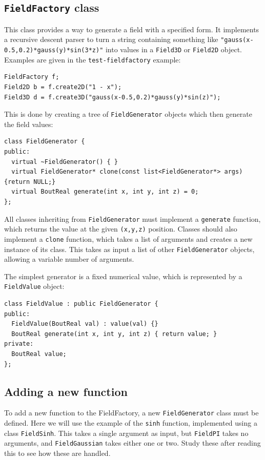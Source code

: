 \documentclass[12pt]{article}
\begin{document}
\subsection{\lstinline!FieldFactory! class}

This class provides a way to generate a field with a specified form. It implements
a recursive descent parser to turn a string containing something like
\lstinline!"gauss(x-0.5,0.2)*gauss(y)*sin(3*z)"! into values in a \lstinline!Field3D!
or \lstinline!Field2D! object. Examples are given in the \texttt{test-fieldfactory} example:
\begin{lstlisting}
FieldFactory f;
Field2D b = f.create2D("1 - x");
Field3D d = f.create3D("gauss(x-0.5,0.2)*gauss(y)*sin(z)");
\end{lstlisting}

This is done by creating a tree of \lstinline!FieldGenerator! objects
which then generate the field values: 
\begin{lstlisting}[firstnumber=49]
class FieldGenerator {
public:
  virtual ~FieldGenerator() { }
  virtual FieldGenerator* clone(const list<FieldGenerator*> args) {return NULL;}
  virtual BoutReal generate(int x, int y, int z) = 0;
};
\end{lstlisting}
All classes inheriting from \lstinline!FieldGenerator! must implement a
\lstinline!generate! function, which returns the value
at the given \lstinline!(x,y,z)! position. Classes should also implement a
\lstinline!clone! function, which takes a list of arguments and creates a new
instance of its class. This takes as input a list of other \lstinline!FieldGenerator! objects,
allowing a variable number of arguments. 

The simplest generator is a fixed numerical value, which is represented
by a \lstinline!FieldValue! object: 
\begin{lstlisting}[firstnumber=59]
class FieldValue : public FieldGenerator {
public:
  FieldValue(BoutReal val) : value(val) {}
  BoutReal generate(int x, int y, int z) { return value; }
private:
  BoutReal value;
};
\end{lstlisting}

\subsection{Adding a new function}

To add a new function to the FieldFactory, a new \lstinline!FieldGenerator! class
must be defined. Here we will use the example of the \lstinline!sinh! function, implemented
using a class \lstinline!FieldSinh!. This takes a single argument as input, but
\lstinline!FieldPI! takes no arguments, and \lstinline!FieldGaussian! takes either one or two.
Study these after reading this to see how these are handled.
\end{document}

